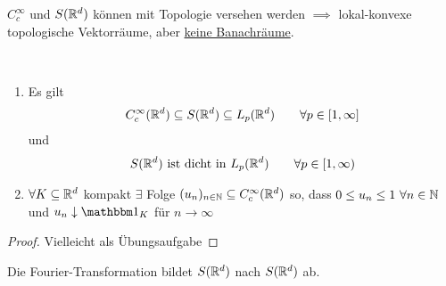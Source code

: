 \begin{bemerkung}
$C_c^\infty$ und $S(\mathbb{R}^d)$ können mit Topologie versehen werden $\implies$ lokal-konvexe topologische Vektorräume, aber \underline{keine Banachräume}.
\end{bemerkung}

\begin{proposition}\label{proposition7.1}\
\begin{enumerate}[label=(\alph*)]
\item Es gilt
\begin{align*}
C_c^\infty(\mathbb{R}^d)\subseteq S(\mathbb{R}^d)\subseteq L_p(\mathbb{R}^d)\qquad\forall p\in[1,\infty]
\end{align*}
und
\begin{align*}
	S(\mathbb{R}^d)\text{ ist dicht in }L_p(\mathbb{R}^d)\qquad\forall p\in[1,\infty)
\end{align*}
\item $\forall K\subseteq\mathbb{R}^d$ kompakt $\exists$ Folge $(u_n)_{n\in\mathbb{N}}\subseteq C_c^\infty(\mathbb{R}^d)$ so, dass $0\leq u_n\leq 1~\forall n\in\mathbb{N}$ und $u_n\downarrow\indi_K$ für $n\to\infty$
\end{enumerate}
\end{proposition}
\begin{proof}
	Vielleicht als Übungsaufgabe
\end{proof}

\begin{theorem}\label{theorem7.2}
Die Fourier-Transformation bildet $S(\mathbb{R}^d)$ nach $S(\mathbb{R}^d)$ ab.
\end{theorem}

